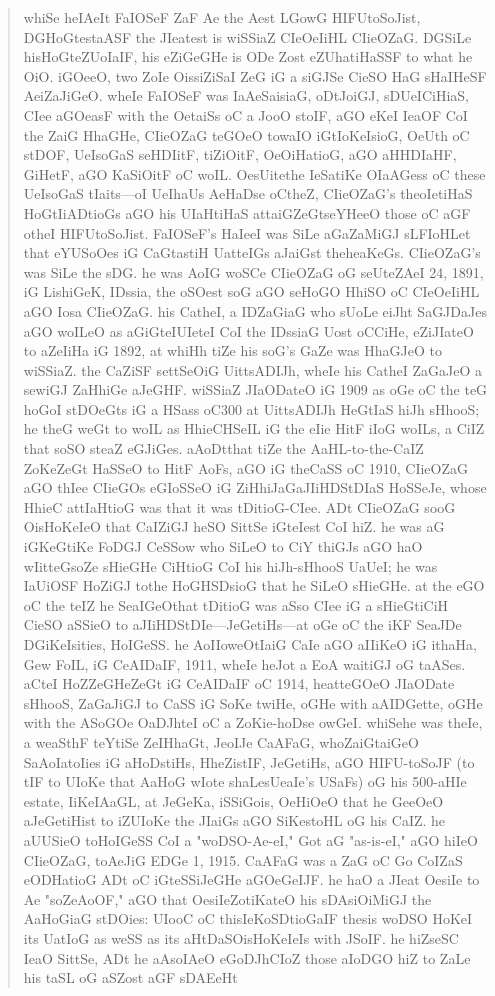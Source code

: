 \documentclass{labreport}
\begin{document}
\begin{quote}\footnotesize\ttfamily\raggedright
whiSe heIAeIt FaIOSeF ZaF Ae the Aest LGowG HIFUtoSoJist, DGHoGtestaASF the JIeatest is wiSSiaZ CIeOeIiHL CIieOZaG. DGSiLe hisHoGteZUoIaIF, his eZiGeGHe is ODe Zost eZUhatiHaSSF to what he OiO. iGOeeO, two ZoIe OissiZiSaI ZeG iG a siGJSe CieSO HaG sHaIHeSF AeiZaJiGeO. wheIe FaIOSeF was IaAeSaisiaG, oDtJoiGJ, sDUeICiHiaS, CIee aGOeasF with the OetaiSs oC a JooO stoIF, aGO eKeI IeaOF CoI the ZaiG HhaGHe, CIieOZaG teGOeO towaIO iGtIoKeIsioG, OeUth oC stDOF, UeIsoGaS seHDIitF, tiZiOitF, OeOiHatioG, aGO aHHDIaHF, GiHetF, aGO KaSiOitF oC woIL. OesUitethe IeSatiKe OIaAGess oC these UeIsoGaS tIaits---oI UeIhaUs AeHaDse oCtheZ, CIieOZaG's theoIetiHaS HoGtIiADtioGs aGO his UIaHtiHaS attaiGZeGtseYHeeO those oC aGF otheI HIFUtoSoJist. FaIOSeF's HaIeeI was SiLe aGaZaMiGJ sLFIoHLet that eYUSoOes iG CaGtastiH UatteIGs aJaiGst theheaKeGs. CIieOZaG's was SiLe the sDG. he was AoIG woSCe CIieOZaG oG seUteZAeI 24, 1891, iG LishiGeK, IDssia, the oSOest soG aGO seHoGO HhiSO oC CIeOeIiHL aGO Iosa CIieOZaG. his CatheI, a IDZaGiaG who sUoLe eiJht SaGJDaJes aGO woILeO as aGiGteIUIeteI CoI the IDssiaG Uost oCCiHe, eZiJIateO to aZeIiHa iG 1892, at whiHh tiZe his soG's GaZe was HhaGJeO to wiSSiaZ. the CaZiSF settSeOiG UittsADIJh, wheIe his CatheI ZaGaJeO a sewiGJ ZaHhiGe aJeGHF. wiSSiaZ JIaODateO iG 1909 as oGe oC the teG hoGoI stDOeGts iG a HSass oC300 at UittsADIJh HeGtIaS hiJh sHhooS; he theG weGt to woIL as HhieCHSeIL iG the eIie HitF iIoG woILs, a CiIZ that soSO steaZ eGJiGes. aAoDtthat tiZe the AaHL-to-the-CaIZ ZoKeZeGt HaSSeO to HitF AoFs, aGO iG theCaSS oC 1910, CIieOZaG aGO thIee CIieGOs eGIoSSeO iG ZiHhiJaGaJIiHDStDIaS HoSSeJe, whose HhieC attIaHtioG was that it was tDitioG-CIee. ADt CIieOZaG sooG OisHoKeIeO that CaIZiGJ heSO SittSe iGteIest CoI hiZ. he was aG iGKeGtiKe FoDGJ CeSSow who SiLeO to CiY thiGJs aGO haO wIitteGsoZe sHieGHe CiHtioG CoI his hiJh-sHhooS UaUeI; he was IaUiOSF HoZiGJ tothe HoGHSDsioG that he SiLeO sHieGHe. at the eGO oC the teIZ he SeaIGeOthat tDitioG was aSso CIee iG a sHieGtiCiH CieSO aSSieO to aJIiHDStDIe---JeGetiHs---at oGe oC the iKF SeaJDe DGiKeIsities, HoIGeSS. he AoIIoweOtIaiG CaIe aGO aIIiKeO iG ithaHa, Gew FoIL, iG CeAIDaIF, 1911, wheIe heJot a EoA waitiGJ oG taASes. aCteI HoZZeGHeZeGt iG CeAIDaIF oC 1914, heatteGOeO JIaODate sHhooS, ZaGaJiGJ to CaSS iG SoKe twiHe, oGHe with aAIDGette, oGHe with the ASoGOe OaDJhteI oC a ZoKie-hoDse owGeI. whiSehe was theIe, a weaSthF teYtiSe ZeIHhaGt, JeoIJe CaAFaG, whoZaiGtaiGeO SaAoIatoIies iG aHoDstiHs, HheZistIF, JeGetiHs, aGO HIFU-toSoJF (to tIF to UIoKe that AaHoG wIote shaLesUeaIe's USaFs) oG his 500-aHIe estate, IiKeIAaGL, at JeGeKa, iSSiGois, OeHiOeO that he GeeOeO aJeGetiHist to iZUIoKe the JIaiGs aGO SiKestoHL oG his CaIZ. he aUUSieO toHoIGeSS CoI a "woDSO-Ae-eI," Got aG "as-is-eI," aGO hiIeO CIieOZaG, toAeJiG EDGe 1, 1915. CaAFaG was a ZaG oC Go CoIZaS eODHatioG ADt oC iGteSSiJeGHe aGOeGeIJF. he haO a JIeat OesiIe to Ae "soZeAoOF," aGO that OesiIeZotiKateO his sDAsiOiMiGJ the AaHoGiaG stDOies: UIooC oC thisIeKoSDtioGaIF thesis woDSO HoKeI its UatIoG as weSS as its aHtDaSOisHoKeIeIs with JSoIF. he hiZseSC IeaO SittSe, ADt he aAsoIAeO eGoDJhCIoZ those aIoDGO hiZ to ZaLe his taSL oG aSZost aGF sDAEeHt 
\end{quote}
\end{document}
